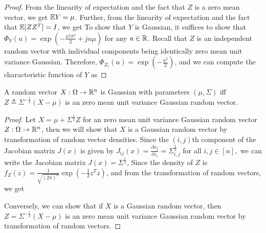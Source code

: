 \documentclass[letterpaper,10pt,english]{article}
\begin{document}
\begin{proof}
From the linearity of expectation and the fact that $Z$ is a zero mean vector, 
we get $\mathbb{E} Y = \mu$. 
Further, from the linearity of expectation and the fact that $\mathbb{E}[ZZ^T] = I$, we get 
To show that $Y$ is Gaussian, 
it suffices to show that $\Phi_Y(u) = \exp(-\frac{u^2\sigma^2}{2}+ju\mu)$ for any $u \in \mathbb{R}$. 
Recall that $Z$ is an independent random vector with individual components being identically zero mean unit variance Gaussian. 
Therefore, $\Phi_{Z_i}(u) = \exp(-\frac{u^2}{2})$, 
and we can compute the characteristic function of $Y$ as 
\end{proof}
\begin{thm}%
A random vector $X: \Omega\to\mathbb{R}^n$ is Gaussian with parameters $(\mu, \Sigma)$ iff $Z \triangleq \Sigma^{-\frac{1}{2}}(X-\mu)$ is an \iid zero mean unit variance Gaussian random vector. 
\end{thm}
\begin{proof}
Let  $X = \mu + \Sigma^{\frac{1}{2}}Z$ for an \iid zero mean unit variance Gaussian random vector $Z:\Omega\to\mathbb{R}^n$, 
then we will show that $X$ is a Gaussian random vector by transformation of random vector densities. 
Since the $(i,j)$th component of the Jacobian matrix $J(x)$ is given by 
$J_{ij}(x) = \frac{\partial x_j}{\partial z_i} = \Sigma^{\frac{1}{2}}_{i,j}$ for all $i,j\in [n],$
we can write the Jacobian matrix $J(x) = \Sigma^{\frac{1}{2}}$, 
Since the density of $Z$ is $f_Z(z) = \frac{1}{\sqrt{(2\pi)^n}}\exp(-\frac{1}{2}z^Tz)$, 
and from the transformation of random vectors, we get 

Conversely, we can show that if $X$ is a Gaussian random vector, then $Z = \Sigma^{-\frac{1}{2}}(X-\mu)$ is an \iid zero mean unit variance Gaussian random vector by transformation of random vectors. 
\end{proof}
\end{document}
